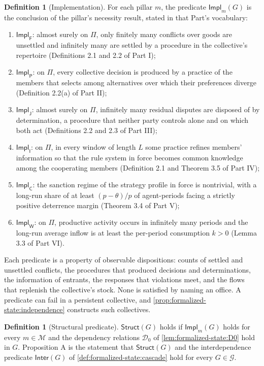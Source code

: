 \documentclass[11pt,letterpaper]{article}
\theoremstyle{definition}
\newtheorem{definition}[theorem]{Definition}
\theoremstyle{remark}
\newcommand{\pF}{\mathsf{F}}
\newcommand{\pP}{\mathsf{P}}
\newcommand{\pJ}{\mathsf{J}}
\newcommand{\pI}{\mathsf{I}}
\newcommand{\pC}{\mathsf{C}}
\newcommand{\pW}{\mathsf{W}}
\newcommand{\Mset}{\mathcal{M}}
\newcommand{\Struct}{\mathsf{Struct}}
\newcommand{\Inter}{\mathsf{Inter}}
\newcommand{\Impl}{\mathsf{Impl}}
\newcommand{\Dzero}{\mathcal{D}_0}
\begin{document}
\begin{definition}[Implementation]
\label{def:formalized-state:implementation}
For each pillar $m$, the predicate $\Impl_m(G)$ is the conclusion of the pillar's necessity result, stated in that Part's vocabulary:
\begin{enumerate}[label=(\roman*)]
\item $\Impl_{\pF}$: almost surely on $\Pi$, only finitely many conflicts over goods are unsettled and infinitely many are settled by a procedure in the collective's repertoire (Definitions 2.1 and 2.2 of Part I);
\item $\Impl_{\pP}$: on $\Pi$, every collective decision is produced by a practice of the members that selects among alternatives over which their preferences diverge (Definition 2.2(a) of Part II);
\item $\Impl_{\pJ}$: almost surely on $\Pi$, infinitely many residual disputes are disposed of by determination, a procedure that neither party controls alone and on which both act (Definitions 2.2 and 2.3 of Part III);
\item $\Impl_{\pI}$: on $\Pi$, in every window of length $L$ some practice refines members' information so that the rule system in force becomes common knowledge among the cooperating members (Definition 2.1 and Theorem 3.5 of Part IV);
\item $\Impl_{\pC}$: the sanction regime of the strategy profile in force is nontrivial, with a long-run share of at least $(p-\theta)/p$ of agent-periods facing a strictly positive deterrence margin (Theorem 3.4 of Part V);
\item $\Impl_{\pW}$: on $\Pi$, productive activity occurs in infinitely many periods and the long-run average inflow is at least the per-period consumption $k>0$ (Lemma 3.3 of Part VI).
\end{enumerate}
\end{definition}

Each predicate is a property of observable dispositions: counts of settled and unsettled conflicts, the procedures that produced decisions and determinations, the information of entrants, the responses that violations meet, and the flows that replenish the collective's stock. None is satisfied by naming an office. A predicate can fail in a persistent collective, and \cref{prop:formalized-state:independence} constructs such collectives.

\begin{definition}[Structural predicate]
\label{def:formalized-state:struct}
$\Struct(G)$ holds if $\Impl_m(G)$ holds for every $m\in\Mset$ and the dependency relations $\Dzero$ of \cref{lem:formalized-state:D0} hold in $G$. Proposition A is the statement that $\Struct(G)$ and the interdependence predicate $\Inter(G)$ of \cref{def:formalized-state:cascade} hold for every $G\in\mathcal{G}$.
\end{definition}
\end{document}
